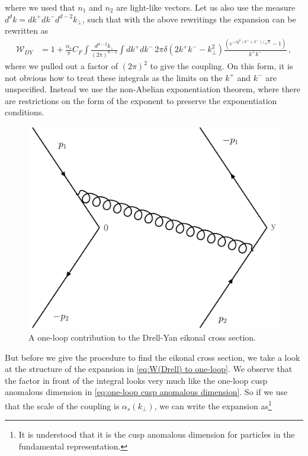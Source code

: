 where we used that $n_1$ and $n_2$ are light-like vectors. Let us also use the measure $d^{d}k=dk^{+}dk^{-}d^{d-2}k_{\perp}$, such that with the above rewritings the expansion can be rewritten as
\begin{align}\label{eq:W(Drell) to one-loop}
    \mathcal{W}_{DY}&=1+\frac{\alpha_{s}}{\pi}C_{F}\int\frac{d^{d-2}k_{\perp}}{(2\pi)^{d-2}}\int dk^{+}dk^{-}\,2\pi\delta(2k^{+}k^{-}-k_{\perp}^{2})\frac{(e^{-iy^{0}(k^{+}+k^{-})/\sqrt{2}}-1)}{k^{+}k^{-}}\,,
\end{align}
where we pulled out a factor of $(2\pi)^{2}$ to give the coupling. On this form, it is not obvious how to treat these integrals as the limits on the $k^{+}$ and $k^{-}$ are unspecified. Instead we use the non-Abelian exponentiation theorem, where there are restrictions on the form of the exponent to preserve the exponentiation conditions.
\begin{figure}
    \centering
    \includegraphics[scale=0.3]{Figures/DrellYanLoop.pdf}
    \caption{A one-loop contribution to the Drell-Yan eikonal cross section.}
    \label{fig:DYwilsonloopcutpropagator}
\end{figure}
But before we give the procedure to find the eikonal cross section, we take a look at the structure of the expansion in \cref{eq:W(Drell) to one-loop}. We observe that the factor in front of the integral looks very much like the one-loop cusp anomalous dimension in \cref{eq:one-loop cusp anomalous dimension}. So if we use that the scale of the coupling is $\alpha_{s}(k_{\perp})$, we can write the expansion as\footnote{It is understood that it is the cusp anomalous dimension for particles in the fundamental representation.}
